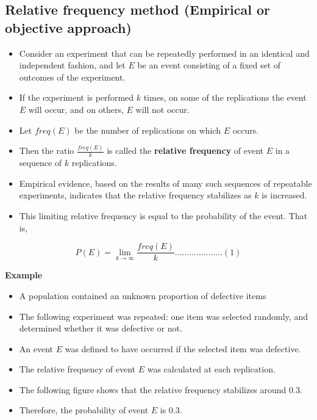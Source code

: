 \documentclass[]{book}
\providecommand{\tightlist}{%
  \setlength{\itemsep}{0pt}\setlength{\parskip}{0pt}}
\begin{document}
\hypertarget{relative-frequency-method-empirical-or-objective-approach}{%
\subsection{Relative frequency method (Empirical or objective approach)}\label{relative-frequency-method-empirical-or-objective-approach}}

\begin{itemize}
\tightlist
\item
  Consider an experiment that can be repeatedly performed in an identical and independent fashion, and let \(E\) be an event consisting of a ﬁxed set of outcomes of the experiment.
\item
  If the experiment is performed \(k\) times, on some of the replications the event \(E\) will occur, and on others, \(E\) will not occur.\\
\item
  Let \(freq (E)\) be the number of replications on which \(E\) occurs.
\item
  Then the ratio \(\frac{freq (E)}k\) is called the \textbf{relative frequency} of event \(E\) in a sequence of \(k\) replications.
\item
  Empirical evidence, based on the results of many such sequences of repeatable experiments, indicates that the relative frequency stabilizes as \(k\) is increased.
\item
  This limiting relative frequency is equal to the probability of the event. That is,
\end{itemize}

\[P(E) = \lim \limits_{k \to \infty}\frac{freq(E)}{k}....................(1)\]

\textbf{Example}

\begin{itemize}
\tightlist
\item
  A population contained an unknown proportion of defective items
\item
  The following experiment was repeated: one item was selected randomly, and determined whether it was defective or not.
\item
  An event \(E\) was defined to have occurred if the selected item was defective.
\item
  The relative frequency of event \(E\) was calculated at each replication.
\item
  The following figure shows that the relative frequency stabilizes around 0.3.
\item
  Therefore, the probability of event \(E\) is 0.3.
\end{itemize}
\end{document}
